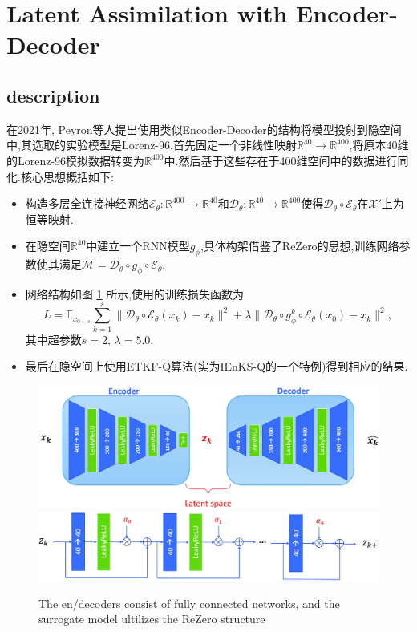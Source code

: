 \documentclass{article}
\newcommand{\mR}{\mathbb{R}}
\newcommand{\mM}{\mathcal{M}}
\newcommand{\mX}{\mathcal{X}}
\newcommand{\mE}{\mathcal{E}}
\newcommand{\mbE}{\mathbb{E}}
\newcommand{\mD}{\mathcal{D}}
\begin{document}
\section{Latent Assimilation with Encoder-Decoder}
\subsection{description}
在2021年, Peyron等人\cite{Peyron2021LAwithAE}提出使用类似Encoder-Decoder的结构将模型投射到隐空间中,其选取的实验模型是Lorenz-96.首先固定一个非线性映射$\mR^{40}\to\mR^{400}$,将原本40维的Lorenz-96模拟数据转变为$\mR^{400}$中.然后基于这些存在于400维空间中的数据进行同化.核心思想概括如下:
\begin{itemize}
	\item 构造多层全连接神经网络$\mE_\theta:\mR^{400}\to\mR^{40}$和$\mD_\theta:\mR^{40}\to\mR^{400}$使得$\mD_\theta\circ\mE_\theta$在$\mX'$上为恒等映射.
	\item 在隐空间$\mR^{40}$中建立一个RNN模型$g_\phi$,具体构架借鉴了ReZero\cite{bachlechner2021rezero}的思想,训练网络参数使其满足$\mM=\mD_\theta\circ g_\phi\circ\mE_\theta$.
	\item 网络结构如图 \ref{fig:Peyron2021-structure} 所示,使用的训练损失函数为
	      \[L=\mbE_{x_{0\sim s}}\sum_{k=1}^s\|\mD_\theta\circ\mE_\theta(x_k)-x_k\|^2+\lambda\|\mD_\theta\circ g_\phi^k\circ\mE_\theta(x_0)-x_k\|^2,\]
	      其中超参数$s=2$, $\lambda=5.0$.
	\item 最后在隐空间上使用ETKF-Q算法(实为IEnKS-Q\cite{Fillion2020IEnKS}的一个特例)得到相应的结果.
\end{itemize}
\begin{figure}\label{fig:Peyron2021-structure}
	\centering
	\includegraphics[width=.7\textwidth]{figs/encoder-decoder.jpg}
	\includegraphics[width=.7\textwidth]{figs/surrogate-model.jpg}
	\caption{The en/decoders consist of fully connected networks, and the surrogate model ultilizes the ReZero structure}
\end{figure}
\end{document}
